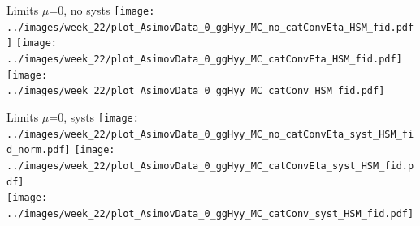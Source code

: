 \documentclass[10pt,UKenglish, leqno, xcolor = dvipsnames]{beamer}
\begin{document}
		\begin{frame}{Limits $\mu$=0, no systs}
			\vfill
			\centering
			\texttt{[image: ../images/week\_22/plot\_AsimovData\_0\_ggHyy\_MC\_no\_catConvEta\_HSM\_fid.pdf]}
			\texttt{[image: ../images/week\_22/plot\_AsimovData\_0\_ggHyy\_MC\_catConvEta\_HSM\_fid.pdf]}\\
			\texttt{[image: ../images/week\_22/plot\_AsimovData\_0\_ggHyy\_MC\_catConv\_HSM\_fid.pdf]}
			\vfill
		\end{frame}
	
		\begin{frame}{Limits $\mu$=0, systs}
			\vfill
			\centering
			\texttt{[image: ../images/week\_22/plot\_AsimovData\_0\_ggHyy\_MC\_no\_catConvEta\_syst\_HSM\_fid\_norm.pdf]}
			\texttt{[image: ../images/week\_22/plot\_AsimovData\_0\_ggHyy\_MC\_catConvEta\_syst\_HSM\_fid.pdf]}\\
			\texttt{[image: ../images/week\_22/plot\_AsimovData\_0\_ggHyy\_MC\_catConv\_syst\_HSM\_fid.pdf]}
			\vfill
		\end{frame}
	
\end{document}
